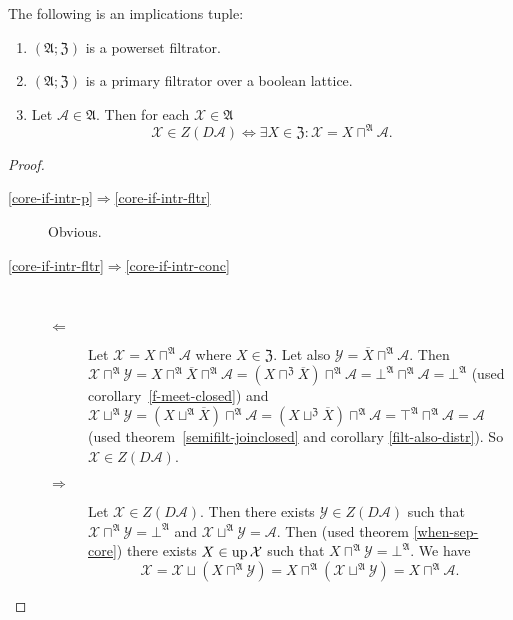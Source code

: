 \begin{thm}
\label{core-if-intr}The following is an implications tuple:
\begin{enumerate}
\item \label{core-if-intr-p}$(\mathfrak{A};\mathfrak{Z})$ is a powerset
filtrator.
\item \label{core-if-intr-fltr}$(\mathfrak{A};\mathfrak{Z})$ is a primary
filtrator over a boolean lattice.
\item \label{core-if-intr-conc}Let $\mathcal{A}\in\mathfrak{A}$. Then
for each $\mathcal{X}\in\mathfrak{A}$
\[
\mathcal{X}\in Z(D\mathcal{A})\Leftrightarrow\exists X\in\mathfrak{Z}:\mathcal{X}=X\sqcap^{\mathfrak{A}}\mathcal{A}.
\]

\end{enumerate}
\end{thm}
\begin{proof}
~
\begin{description}
\item [{\ref{core-if-intr-p}$\Rightarrow$\ref{core-if-intr-fltr}}] Obvious.
\item [{\ref{core-if-intr-fltr}$\Rightarrow$\ref{core-if-intr-conc}}] ~

\begin{description}
\item [{$\Leftarrow$}] Let $\mathcal{X}=X\sqcap^{\mathfrak{A}}\mathcal{A}$
where $X\in\mathfrak{Z}$. Let also $\mathcal{Y}=\overline{X}\sqcap^{\mathfrak{A}}\mathcal{A}$.
Then $\mathcal{X}\sqcap^{\mathfrak{A}}\mathcal{Y}=X\sqcap^{\mathfrak{A}}\overline{X}\sqcap^{\mathfrak{A}}\mathcal{A}=(X\sqcap^{\mathfrak{Z}}\overline{X})\sqcap^{\mathfrak{A}}\mathcal{A}=\bot^{\mathfrak{A}}\sqcap^{\mathfrak{A}}\mathcal{A}=\bot^{\mathfrak{A}}$
(used corollary~\ref{f-meet-closed}) and $\mathcal{X}\sqcup^{\mathfrak{A}}\mathcal{Y}=(X\sqcup^{\mathfrak{A}}\overline{X})\sqcap^{\mathfrak{A}}\mathcal{A}=(X\sqcup^{\mathfrak{Z}}\overline{X})\sqcap^{\mathfrak{A}}\mathcal{A}=\top^{\mathfrak{A}}\sqcap^{\mathfrak{A}}\mathcal{A}=\mathcal{A}$
(used theorem~\ref{semifilt-joinclosed} and corollary \ref{filt-also-distr}).
So $\mathcal{X}\in Z(D\mathcal{A})$.
\item [{$\Rightarrow$}] Let $\mathcal{X}\in Z(D\mathcal{A})$. Then there
exists $\mathcal{Y}\in Z(D\mathcal{A})$ such that $\mathcal{X}\sqcap^{\mathfrak{A}}\mathcal{Y}=\bot^{\mathfrak{A}}$
and $\mathcal{X}\sqcup^{\mathfrak{A}}\mathcal{Y}=\mathcal{A}$. Then
(used theorem \ref{when-sep-core}) there exists $X\in\operatorname{up}\mathcal{X}$
such that $X\sqcap^{\mathfrak{A}}\mathcal{Y}=\bot^{\mathfrak{A}}$.
We have
\[
\mathcal{X}=\mathcal{X}\sqcup(X\sqcap^{\mathfrak{A}}\mathcal{Y})=X\sqcap^{\mathfrak{A}}(\mathcal{X}\sqcup^{\mathfrak{A}}\mathcal{Y})=X\sqcap^{\mathfrak{A}}\mathcal{A}.
\]

\end{description}
\end{description}
\end{proof}

